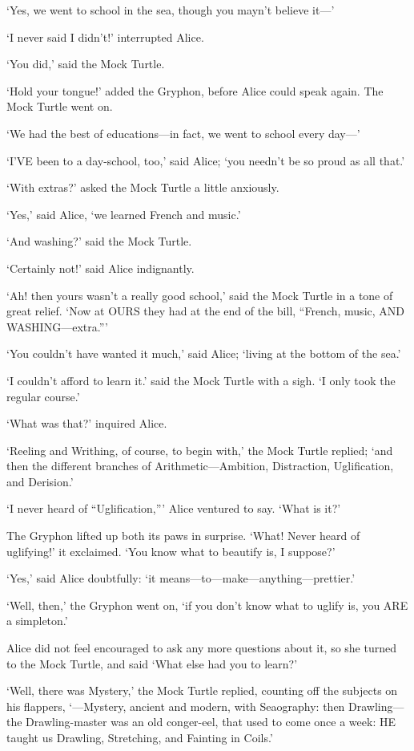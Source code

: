 \documentclass[12pt]{book}
\begin{document}
\begin{Parallel}[p]{}{}
{‘Yes, we went to school in the sea, though you mayn’t believe it—’

‘I never said I didn’t!’ interrupted Alice.

‘You did,’ said the Mock Turtle.

‘Hold your tongue!’ added the Gryphon, before Alice could speak again. The Mock Turtle went on.

‘We had the best of educations—in fact, we went to school every day—’

‘I’VE been to a day-school, too,’ said Alice; ‘you needn’t be so proud as all that.’

‘With extras?’ asked the Mock Turtle a little anxiously.

‘Yes,’ said Alice, ‘we learned French and music.’

‘And washing?’ said the Mock Turtle.

‘Certainly not!’ said Alice indignantly.

‘Ah! then yours wasn’t a really good school,’ said the Mock Turtle in a tone of great relief. ‘Now at OURS they had at the end of the bill, “French, music, AND WASHING—extra.”’

‘You couldn’t have wanted it much,’ said Alice; ‘living at the bottom of the sea.’

‘I couldn’t afford to learn it.’ said the Mock Turtle with a sigh. ‘I only took the regular course.’

‘What was that?’ inquired Alice.

‘Reeling and Writhing, of course, to begin with,’ the Mock Turtle replied; ‘and then the different branches of Arithmetic—Ambition, Distraction, Uglification, and Derision.’

‘I never heard of “Uglification,”’ Alice ventured to say. ‘What is it?’

The Gryphon lifted up both its paws in surprise. ‘What! Never heard of uglifying!’ it exclaimed. ‘You know what to beautify is, I suppose?’

‘Yes,’ said Alice doubtfully: ‘it means—to—make—anything—prettier.’

‘Well, then,’ the Gryphon went on, ‘if you don’t know what to uglify is, you ARE a simpleton.’

Alice did not feel encouraged to ask any more questions about it, so she turned to the Mock Turtle, and said ‘What else had you to learn?’

‘Well, there was Mystery,’ the Mock Turtle replied, counting off the subjects on his flappers, ‘—Mystery, ancient and modern, with Seaography: then Drawling—the Drawling-master was an old conger-eel, that used to come once a week: HE taught us Drawling, Stretching, and Fainting in Coils.’

}
\end{Parallel}
\end{document}
